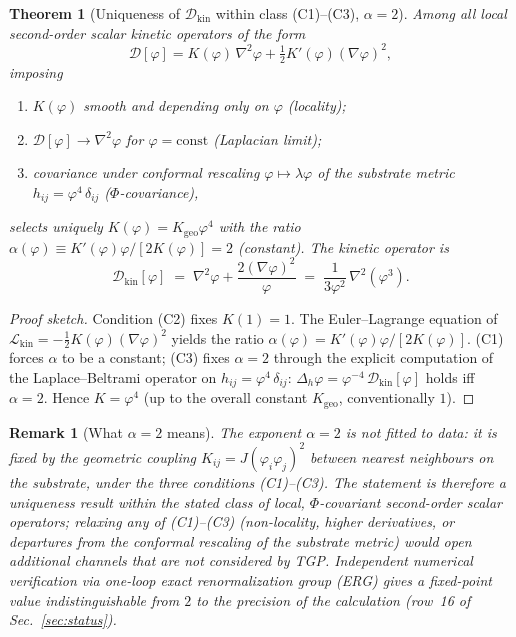 \documentclass[11pt,a4paper]{article}
\renewcommand{\Phi}{\varPhi}
\newcommand{\DD}{\mathcal{D}}
\newtheorem{theorem}[axiom]{Theorem}
\newtheorem{remark}[axiom]{Remark}
\begin{document}
\begin{theorem}[Uniqueness of $\DD_{\mathrm{kin}}$ within class (C1)--(C3), $\alpha=2$]\label{thm:alpha2}
Among all local second-order scalar kinetic operators of the form
\begin{equation}
  \DD[\varphi]
  = K(\varphi)\,\nabla^{2}\varphi
  + \tfrac{1}{2}K'(\varphi)(\nabla\varphi)^{2},
\end{equation}
imposing
\begin{enumerate}[(C1),nosep]
  \item $K(\varphi)$ smooth and depending only on $\varphi$ (locality);
  \item $\DD[\varphi]\to\nabla^{2}\varphi$ for $\varphi=\mathrm{const}$
    (Laplacian limit);
  \item covariance under conformal rescaling $\varphi\mapsto\lambda\varphi$
    of the substrate metric $h_{ij}=\varphi^{4}\,\delta_{ij}$
    ($\Phi$-covariance),
\end{enumerate}
selects uniquely $K(\varphi)=K_{\mathrm{geo}}\varphi^{4}$ with the
ratio $\alpha(\varphi)\equiv K'(\varphi)\varphi/[2K(\varphi)]=2$ (constant).
The kinetic operator is
\begin{equation}\label{eq:Dkin}
  \boxed{\;
    \DD_{\mathrm{kin}}[\varphi]
    \;=\;\nabla^{2}\varphi+\frac{2(\nabla\varphi)^{2}}{\varphi}
    \;=\;\frac{1}{3\varphi^{2}}\,\nabla^{2}(\varphi^{3}).
  \;}
\end{equation}
\end{theorem}

\begin{proof}[Proof sketch]
Condition (C2) fixes $K(1)=1$. The Euler--Lagrange equation of
$\mathcal{L}_{\mathrm{kin}}=-\tfrac{1}{2}K(\varphi)(\nabla\varphi)^{2}$
yields the ratio $\alpha(\varphi)=K'(\varphi)\varphi/[2K(\varphi)]$.
(C1) forces $\alpha$ to be a constant; (C3) fixes $\alpha=2$ through the
explicit computation of the Laplace--Beltrami operator on
$h_{ij}=\varphi^{4}\,\delta_{ij}$:
$\Delta_{h}\varphi=\varphi^{-4}\,\DD_{\mathrm{kin}}[\varphi]$ holds
iff $\alpha=2$. Hence $K=\varphi^{4}$ (up to the overall constant
$K_{\mathrm{geo}}$, conventionally $1$).
\end{proof}

\begin{remark}[What $\alpha=2$ means]
The exponent $\alpha=2$ is \emph{not} fitted to data: it is fixed by the
geometric coupling $K_{ij}=J(\varphi_{i}\varphi_{j})^{2}$ between nearest
neighbours on the substrate, under the three conditions (C1)--(C3). The
statement is therefore a uniqueness result \emph{within} the stated
class of local, $\Phi$-covariant second-order scalar operators; relaxing
any of (C1)--(C3) (non-locality, higher derivatives, or departures from
the conformal rescaling of the substrate metric) would open additional
channels that are not considered by TGP. Independent numerical
verification via one-loop exact renormalization group (ERG) gives a
fixed-point value indistinguishable from $2$ to the precision of the
calculation (row~16 of Sec.~\ref{sec:status}).
\end{remark}
\end{document}
